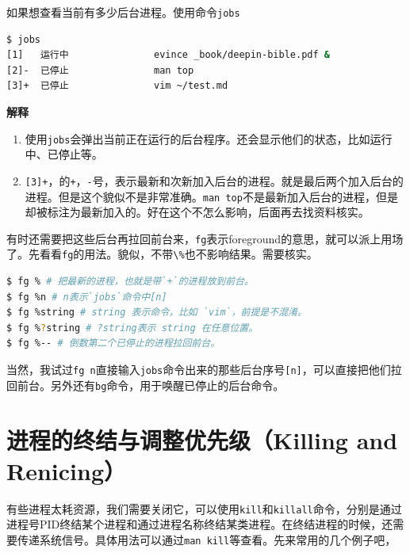 \documentclass[doctor,openright,twoside]{sjtuthesis}
\providecommand{\tightlist}{%
    \setlength{\itemsep}{0pt}\setlength{\parskip}{0pt}}
\newcommand{\passthrough}[1]{#1}
\theoremstyle{plain}
\theoremstyle{definition}
\theoremstyle{remark}
\theoremstyle{ocrenumbox}
\theoremstyle{plain}
\begin{document}
如果想查看当前有多少后台进程。使用命令\passthrough{\lstinline!jobs!}

\begin{lstlisting}[language=bash]
$ jobs
[1]   运行中               evince _book/deepin-bible.pdf &
[2]-  已停止               man top
[3]+  已停止               vim ~/test.md
\end{lstlisting}

\textbf{解释}

\begin{enumerate}
\def\labelenumi{\arabic{enumi}.}
\tightlist
\item
  使用\passthrough{\lstinline!jobs!}会弹出当前正在运行的后台程序。还会显示他们的状态，比如运行中、已停止等。
\item
  \passthrough{\lstinline![3]+!}，的\passthrough{\lstinline!+!}，\passthrough{\lstinline!-!}号，表示最新和次新加入后台的进程。就是最后两个加入后台的进程。但是这个貌似不是非常准确。\passthrough{\lstinline!man top!}不是最新加入后台的进程，但是却被标注为最新加入的。好在这个不怎么影响，后面再去找资料核实。
\end{enumerate}

有时还需要把这些后台再拉回前台来，\passthrough{\lstinline!fg!}表示foreground的意思，就可以派上用场了。先看看\passthrough{\lstinline!fg!}的用法。貌似，不带\passthrough{\lstinline!\%!}也不影响结果。需要核实。

\begin{lstlisting}[language=bash]
$ fg % # 把最新的进程，也就是带`+`的进程放到前台。
$ fg %n # n表示`jobs`命令中[n]
$ fg %string # string 表示命令，比如 `vim`，前提是不混淆。
$ fg %?string # ?string表示 string 在任意位置。
$ fg %-- # 倒数第二个已停止的进程拉回前台。
\end{lstlisting}

当然，我试过\passthrough{\lstinline!fg n!}直接输入\passthrough{\lstinline!jobs!}命令出来的那些后台序号\passthrough{\lstinline![n]!}，可以直接把他们拉回前台。另外还有\passthrough{\lstinline!bg!}命令，用于唤醒已停止的后台命令。

\hypertarget{killing-and-renicing}{%
\section{进程的终结与调整优先级（Killing and Renicing）}\label{killing-and-renicing}}

有些进程太耗资源，我们需要关闭它，可以使用\passthrough{\lstinline!kill!}和\passthrough{\lstinline!killall!}命令，分别是通过进程号PID终结某个进程和通过进程名称终结某类进程。在终结进程的时候，还需要传递系统信号。具体用法可以通过\passthrough{\lstinline!man kill!}等查看。先来常用的几个例子吧，
\end{document}
